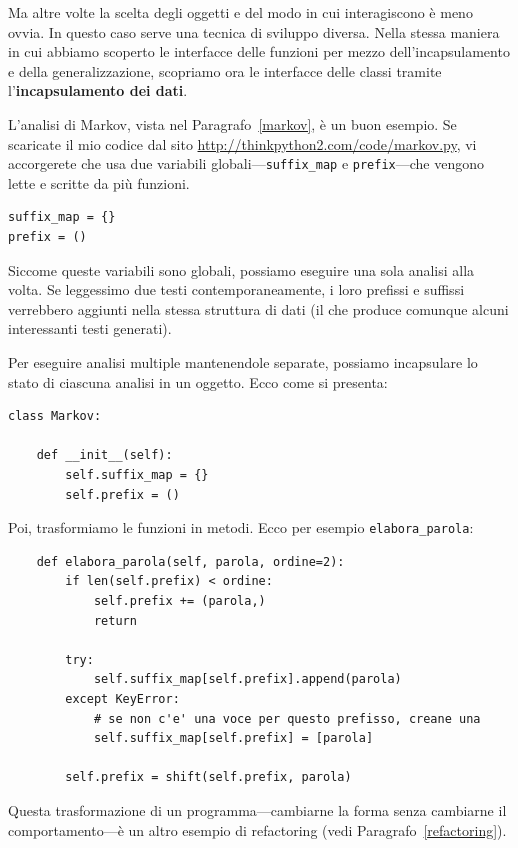 \documentclass[10pt]{book}
\begin{document}
Ma altre volte la scelta degli oggetti e del modo in cui interagiscono è meno ovvia. In questo caso serve una tecnica di sviluppo diversa. Nella stessa maniera in cui abbiamo scoperto le interfacce delle funzioni per mezzo dell'incapsulamento e della generalizzazione, scopriamo ora le interfacce delle classi tramite l'{\bf incapsulamento dei dati}.

L'analisi di Markov, vista nel Paragrafo~\ref{markov}, è un buon esempio. Se scaricate il mio codice dal sito \url{http://thinkpython2.com/code/markov.py}, vi accorgerete che usa due variabili globali---\verb"suffix_map" e \verb"prefix"---che vengono lette e scritte da più funzioni.

\begin{verbatim}
suffix_map = {}        
prefix = ()            
\end{verbatim}

Siccome queste variabili sono globali, possiamo eseguire una sola analisi alla volta. Se leggessimo due testi contemporaneamente, i loro prefissi e suffissi verrebbero aggiunti nella stessa struttura di dati (il che produce comunque alcuni interessanti testi generati).

Per eseguire analisi multiple mantenendole separate, possiamo incapsulare lo stato di ciascuna analisi in un oggetto. Ecco come si presenta:

\begin{verbatim}
class Markov:

    def __init__(self):
        self.suffix_map = {}
        self.prefix = ()    
\end{verbatim}

Poi, trasformiamo le funzioni in metodi. Ecco per esempio \verb"elabora_parola":

\begin{verbatim}
    def elabora_parola(self, parola, ordine=2):
        if len(self.prefix) < ordine:
            self.prefix += (parola,)
            return

        try:
            self.suffix_map[self.prefix].append(parola)
        except KeyError:
            # se non c'e' una voce per questo prefisso, creane una
            self.suffix_map[self.prefix] = [parola]

        self.prefix = shift(self.prefix, parola)        
\end{verbatim}

Questa trasformazione di un programma---cambiarne la forma senza cambiarne il comportamento---è un altro esempio di refactoring (vedi Paragrafo~\ref{refactoring}).
\end{document}

